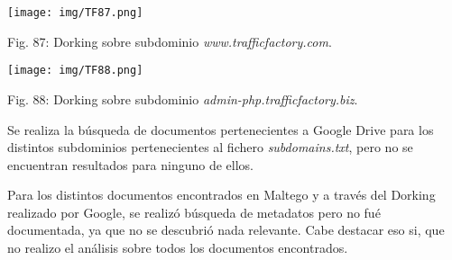 \documentclass[12pt,oneside,a4paper]{book}
\begin{document}
\vspace{2em}

\begin{center}
	\texttt{[image: img/TF87.png]}
    
\vspace{0.1em}
    
    Fig. 87: Dorking sobre subdominio \textit{www.trafficfactory.com}.
\end{center}

\vspace{2em}

\begin{center}
	\texttt{[image: img/TF88.png]}
    
\vspace{0.1em}
    
    Fig. 88: Dorking sobre subdominio \textit{admin-php.trafficfactory.biz}.
\end{center}

\vspace{2em}

\hspace{20pt}
Se realiza la búsqueda de documentos pertenecientes a Google Drive para los distintos subdominios pertenecientes al fichero \textit{subdomains.txt}, pero no se encuentran resultados para ninguno de ellos.

\vspace{1em}

\hspace{20pt}
Para los distintos documentos encontrados en Maltego y a través del Dorking realizado por Google, se realizó búsqueda de metadatos pero no fué documentada, ya que no se descubrió nada relevante. Cabe destacar eso si, que no realizo el análisis sobre todos los documentos encontrados.
\end{document}

